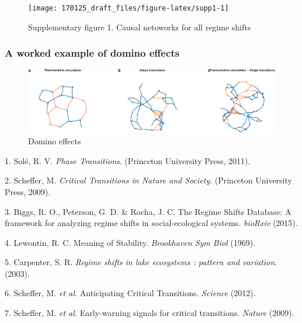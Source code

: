 \documentclass[9pt,]{article}
\begin{document}
\begin{figure}

{\centering \texttt{[image: 170125\_draft\_files/figure-latex/supp1-1]} 

}

\caption{Supplementary figure 1. Causal netoworks for all regime shifts}\label{fig:supp1}
\end{figure}

\subsubsection{A worked example of domino
effects}\label{a-worked-example-of-domino-effects}

\begin{figure}

{\centering \includegraphics{170125_draft_files/figure-latex/supp2-1} 

}

\caption{Domino effects}\label{fig:supp2}
\end{figure}

\hypertarget{refs}{}
\hypertarget{ref-Sole:2011us}{}
1. Solé, R. V. \emph{Phase Transitions}. (Princeton University Press,
2011).

\hypertarget{ref-Scheffer:2009wl}{}
2. Scheffer, M. \emph{Critical Transitions in Nature and Society}.
(Princeton University Press, 2009).

\hypertarget{ref-Biggs:2015iha}{}
3. Biggs, R. O., Peterson, G. D. \& Rocha, J. C. The Regime Shifts
Database: A framework for analyzing regime shifts in social-ecological
systems. \emph{bioRxiv} (2015).

\hypertarget{ref-Lewontin:1969vh}{}
4. Lewontin, R. C. Meaning of Stability. \emph{Brookhaven Sym Biol}
(1969).

\hypertarget{ref-Carpenter2003rsi}{}
5. Carpenter, S. R. \emph{Regime shifts in lake ecosystems : pattern and
variation}. (2003).

\hypertarget{ref-Scheffer:2012cta}{}
6. Scheffer, M. \emph{et al.} Anticipating Critical Transitions.
\emph{Science} (2012).

\hypertarget{ref-Scheffer:2009p4449}{}
7. Scheffer, M. \emph{et al.} Early-warning signals for critical
transitions. \emph{Nature} (2009).
\end{document}
